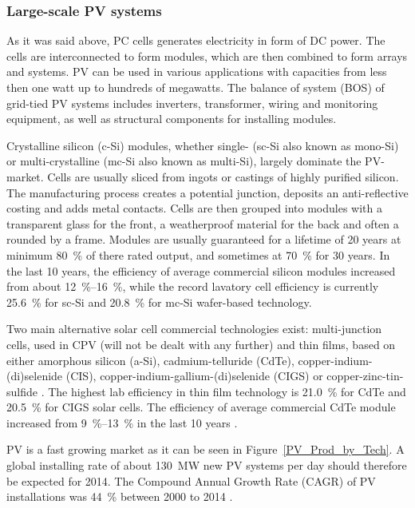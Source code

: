 \subsubsection{Large-scale PV systems}
As it was said above, PC cells generates electricity in form of DC power. The cells are interconnected to form modules, which are then combined to form arrays and systems. PV can be used in various applications with capacities from less then one watt up to hundreds of megawatts. The balance of system (BOS) of grid-tied PV systems includes inverters, transformer, wiring and monitoring equipment, as well as structural components for installing modules.  

Crystalline silicon (c-Si) modules, whether single- (sc-Si also known as mono-Si) or multi-crystalline (mc-Si also known as multi-Si), largely dominate the PV-market. Cells are usually sliced from ingots or castings of highly purified silicon. The manufacturing process creates a potential junction, deposits an anti-reflective costing and adds metal contacts. Cells are then grouped into modules with a transparent glass for the front, a weatherproof material for the back and often a rounded by a frame. Modules are usually guaranteed for a lifetime of 20 years at minimum \SI{80}{\percent} of there rated output, and sometimes at \SI{70}{\percent} for 30 years. In the last 10 years, the efficiency of average commercial silicon modules increased from about \SIrange{12}{16}{\percent}, while the record lavatory cell efficiency is currently \SI{25.6}{\percent} for sc-Si and \SI{20.8}{\percent} for mc-Si wafer-based technology. \cite{FraunhoferISE2015}

Two main alternative solar cell commercial technologies exist: multi-junction cells, used in CPV (will not be dealt with any further) and thin films, based on either amorphous silicon (a-Si), cadmium-telluride (CdTe), copper-indium-(di)selenide (CIS), copper-indium-gallium-(di)selenide (CIGS) or copper-zinc-tin-sulfide \cite{IEA2014c}. The highest lab efficiency in thin film technology is \SI{21.0}{\percent} for CdTe and \SI{20.5}{\percent} for CIGS solar cells. The efficiency of average commercial CdTe module increased from \SIrange{9}{13}{\percent} in the last 10 years \cite{FraunhoferISE2015}.

PV is a fast growing market as it can be seen in Figure~\ref{PV_Prod_by_Tech}. A global installing rate of about \SI{130}{\mega\watt} new PV systems per day should therefore be expected for 2014. The Compound Annual Growth Rate (CAGR) of PV installations was \SI{44}{\percent} between 2000 to 2014 \cite{FraunhoferISE2015}. 

